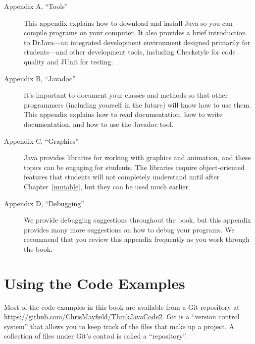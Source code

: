 \begin{description}

\item[Appendix A, ``Tools''] \hfill

This appendix explains how to download and install Java so you can compile programs on your computer.
It also provides a brief introduction to DrJava---an integrated development environment designed primarily for students---and other development tools, including Checkstyle for code quality and JUnit for testing.

\item[Appendix B, ``Javadoc''] \hfill

It's important to document your classes and methods so that other programmers (including yourself in the future) will know how to use them.
This appendix explains how to read documentation, how to write documentation, and how to use the Javadoc tool.

\item[Appendix C, ``Graphics''] \hfill

Java provides libraries for working with graphics and animation, and these topics can be engaging for students.
The libraries require object-oriented features that students will not completely understand until after Chapter~\ref{mutable}, but they can be used much earlier.

\item[Appendix D, ``Debugging''] \hfill

We provide debugging suggestions throughout the book, but this appendix provides many more suggestions on how to debug your programs.
We recommend that you review this appendix frequently as you work through the book.


\end{description}


\section*{Using the Code Examples}
\label{code}

Most of the code examples in this book are available from a Git repository at \url{https://github.com/ChrisMayfield/ThinkJavaCode2}.
Git is a ``version control system'' that allows you to keep track of the files that make up a project.
A collection of files under Git's control is called a ``repository''.


